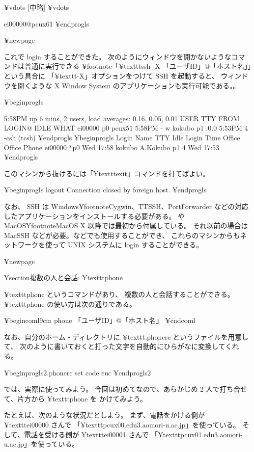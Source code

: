 ¥vdots
[中略]
¥vdots

ei00000@pcux61%
¥end{progls}

¥newpage

これで login することができた。
次のようにウィンドウを開かないようなコマンドは普通に実行できる
¥footnote{「¥texttt{ssh -X 「ユーザID」@「ホスト名」}」という具合に
「¥texttt{-X}」オプションをつけて SSH を起動すると、
ウィンドウを開くような X Window System のアプリケーションも実行可能である。}。

¥begin{progls}

 5:58PM  up 6 mins, 2 users, load averages: 0.16, 0.05, 0.01
USER     TTY FROM              LOGIN@  IDLE WHAT
ei00000  p0  pcux51            5:58PM     - w
kokubo   p1  :0.0              5:53PM     4 -csh (tcsh)
%
¥end{progls}
¥begin{progls}
Login    Name                 TTY  Idle  Login Time   Office     Office Phone
ei00000                      *p0         Wed    17:58
kokubo   A.Kokubo             p1      4  Wed    17:53
%
¥end{progls}

このマシンから抜けるには「¥texttt{exit}」コマンドを打てばよい。

¥begin{progls}
logout
Connection closed by foreign host.
%
¥end{progls}

なお、 SSH は Windows¥footnote{Cygwin、TTSSH、PortForwarder
などの対応したアプリケーションをインストールする必要がある。}
や MacOS¥footnote{MacOS X 以降では最初から付属している。
それ以前の場合は MacSSH などが必要。}などでも使用することができ、
これらのマシンからもネットワークを使って UNIX システムに
 login することができる。

¥newpage

¥section{複数の人と会話: ¥texttt{phone}}

¥texttt{phone} というコマンドがあり、
複数の人と会話することができる。
¥texttt{phone} の使い方は次の通りである。

¥begin{coml}{9cm}
phone 「ユーザID」@「ホスト名」
¥end{coml}

なお、自分のホーム・ディレクトリに ¥texttt{.phonerc} というファイルを用意して、
次のように書いておくと打った文字を自動的にひらがなに変換してくれる。

¥begin{progls2}{.phonerc}
set code euc
¥end{progls2}

では、実際に使ってみよう。
今回は初めてなので、あらかじめ 2 人で打ち合せて、片方から ¥texttt{phone} を
かけてみよう。

たとえば、次のような状況だとしよう。
まず、電話をかける側が ¥texttt{ei00000} さんで
「¥texttt{pcux00.edu3.aomori-u.ac.jp}」を使っている。
そして、電話を受ける側が ¥texttt{ei00001} さんで
「¥texttt{pcux01.edu3.aomori-u.ac.jp}」を使っている。

